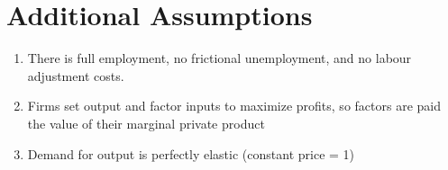 \documentclass{standalone}
\begin{document}
\section*{Additional Assumptions}
\begin{enumerate}
\item There is full employment, no frictional unemployment, and no labour adjustment costs.
\item Firms set output and factor inputs to maximize profits, so factors are paid the value of their marginal private product
\item Demand for output is perfectly elastic (constant price = 1)

\end{enumerate}
\end{document}
